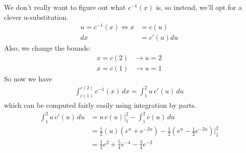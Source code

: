 \documentclass[12pt]{article}
\begin{document}
\begin{solution}
   We don't really want to figure out what $c^{-1}(x)$ is, so instead, we'll opt for a clever u-substitution.
\begin{align*}
    u = c^{-1}(x) \iff x &= c(u) \\
    dx &= c'(u)du
\end{align*}
Also, we change the bounds:
\begin{align*}
    x = c(2) &\rightarrow u = 2 \\
    x = c(1) &\rightarrow u = 1
\end{align*}
So now we have
\begin{align*}
    \int_{c(1)}^{c(2)} c^{-1}(x) \, dx = \int_{1}^{2} u \, c'(u) \, du
\end{align*}
which can be computed fairly easily using integration by parts.
\begin{align*}
    \int_{1}^{2} u \, c'(u) \, du &= u\,c(u) \bigg\rvert_{1}^{2} - \int_{1}^{2} c(u) \, du \\
    &= \frac{1}{2}(u)(e^u + e^{-2u}) - \frac{1}{2}(e^u - \frac{1}{2}e^{-2u}) \bigg\rvert_{1}^{2} \\
    &= \boxed{\frac{1}{2}e^2+\frac{5}{4}e^{-4}-\frac{3}{4}e^{-2}}
\end{align*}
\end{solution}
\end{document}
